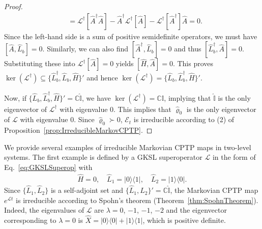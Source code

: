 \documentclass[preprint,pteplogo]{ptephy_v2}%
\numberwithin{equation}{section}
\theoremstyle{definition}
\newcommand{\mc}[1]{\mathcal{#1}}
\newcommand{\mbb}[1]{\mathbb{#1}}
\begin{document}
\begin{proof}
\begin{align}
&= \mc{L}^\dagger[\hat{A}^\dagger \hat{A}] -\hat{A}^\dagger \mc{L}^\dagger[\hat{A}] -\mc{L}^\dagger[\hat{A}^\dagger] \hat{A} 
= 0.
\end{align}
Since the left-hand side is a sum of positive semidefinite operators, we must have $[\hat{A}, \hat{L}_b] = 0$. 
Similarly, we can also find $[\hat{A}^\dagger, \hat{L}_b] = 0$ and thus $[\hat{L}_b^\dagger, \hat{A}]=0$.
Substituting these into $\mc{L}^\dagger[\hat{A}]=0$ yields $[\hat{H}, \hat{A}] = 0$. 
This proves $\ker(\mc{L}^\dagger) \subseteq \{ \hat{L}_b^\dagger, \hat{L}_b, \hat{H} \}'$ and hence $\ker(\mc{L}^\dagger) = \{ \hat{L}_b, \hat{L}_b^\dagger, \hat{H} \}'$.

Now, if $\{ \hat{L}_b, \hat{L}_b^\dagger, \hat{H} \}' = \mbb{C} \hat{\mbb{I}}$, we have $\ker(\mc{L}^\dagger) = \mbb{C} \hat{\mbb{I}}$, implying that $\hat{\mbb{I}}$ is the only eigenvector of $\mc{L}^\dagger$ with eigenvalue $0$.
This implies that $\hat{\varrho}_0$ is the only eigenvector of $\mc{L}$ with eigenvalue $0$.
Since $\hat{\varrho}_0 \succ 0$, $\mc{E}_t$ is irreducible according to (2) of Proposition~\ref{prop:IrreducibleMarkovCPTP}.
\end{proof}

We provide several examples of irreducible Markovian CPTP maps in two-level systems.
The first example is defined by a GKSL superoperator $\mc{L}$ in the form of Eq.~\eqref{eq:GKSLSuperop} with~\cite{yoshida2024uniqueness}
\begin{align}
\hat{H} = 0, \quad 
\hat{L}_1 = | 0 \rangle \langle 1 |, \quad 
\hat{L}_2 = | 1 \rangle \langle 0 |.
\end{align}
Since $\{ \hat{L}_1, \hat{L}_2 \}$ is a self-adjoint set and $\{ \hat{L}_1, \hat{L}_2 \}' = \mathbb{C} \hat{\mbb{I}}$, the Markovian CPTP map $e^{\mc{L}t}$ is irreducible according to Spohn's theorem (Theorem~\ref{thm:SpohnTheorem}).
Indeed, the eigenvalues of $\mc{L}$ are $\lambda = 0$, $-1$, $-1$, $-2$ and the eigenvector corresponding to $\lambda = 0$ is $\hat{X} = | 0 \rangle \langle 0 | + | 1 \rangle \langle 1 |$, which is positive definite.
\end{document}
